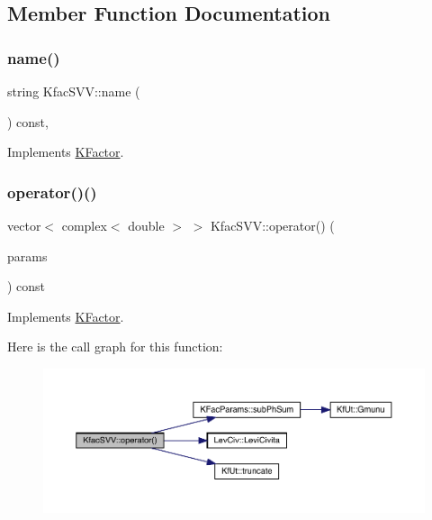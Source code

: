 \subsection{Member Function Documentation}
\mbox{\label{classKfacSVV_ad7ab40ec924a678cd785a9743e676d6c}} 
\subsubsection{\texorpdfstring{name()}{name()}}
{\footnotesize\ttfamily string Kfac\+S\+V\+V\+::name (\begin{DoxyParamCaption}{ }\end{DoxyParamCaption}) const\hspace{0.3cm}{\ttfamily [inline]}, {\ttfamily [virtual]}}



Implements \mbox{\hyperlink{classKFactor_ae578f8d6e4b525895427717da99cab6c}{K\+Factor}}.

\mbox{\label{classKfacSVV_acb7f7f6bf0957694a73271704bb0569f}} 
\subsubsection{\texorpdfstring{operator()()}{operator()()}}
{\footnotesize\ttfamily vector$<$ complex$<$ double $>$ $>$ Kfac\+S\+V\+V\+::operator() (\begin{DoxyParamCaption}\item[{const \mbox{\hyperlink{classKFacParams}{K\+Fac\+Params}} \&}]{params }\end{DoxyParamCaption}) const\hspace{0.3cm}{\ttfamily [virtual]}}



Implements \mbox{\hyperlink{classKFactor_a012aae9ff4a07eab86d5d50b7f774285}{K\+Factor}}.

Here is the call graph for this function\+:
\nopagebreak
\begin{figure}[H]
\begin{center}
\leavevmode
\includegraphics[width=350pt]{d3/d61/classKfacSVV_acb7f7f6bf0957694a73271704bb0569f_cgraph}
\end{center}
\end{figure}


